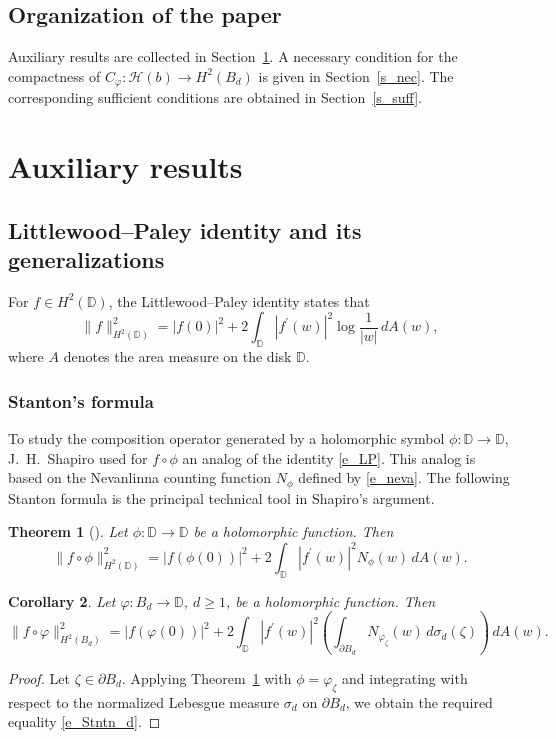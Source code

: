 \documentclass{amsart}
\numberwithin{equation}{section}
\newtheorem{theorem}{Theorem}[section]
\newtheorem{corollary}[theorem]{Corollary}
\theoremstyle{definition}
\newcommand{\bd}{{B_d}}
\newcommand{\neva}{N}
\newcommand{\aream}{A}
\newcommand{\meal}{\sigma_d}
\newcommand{\dbr}{\mathcal{H}}
\newcommand{\za}{\zeta}
\newcommand{\ph}{\varphi}
\newcommand{\cph}{C_\varphi}
\newcommand{\Dbb}{\mathbb D}
\newcommand{\spd}{\partial B_d}
\begin{document}
\subsection*{Organization of the paper}
Auxiliary results are collected in Section~\ref{s_aux}. 
A necessary condition for the compactness of
$\cph: \dbr(b) \to H^2(\bd)$ is given in Section~\ref{s_nec}.
The corresponding sufficient conditions are obtained in Section~\ref{s_suff}.



\section{Auxiliary results}\label{s_aux}
\subsection{Littlewood--Paley identity and its generalizations}\label{ss_HL}

For $f\in H^2(\Dbb)$, the Little\-wood--Paley identity states that
\begin{equation}\label{e_LP}
\|f\|^2_{H^2(\Dbb)} = |f(0)|^2 + 2\int_{\Dbb} |f^\prime(w)|^2 \log\frac{1}{|w|}\, d\aream(w),
\end{equation}
where $\aream$ denotes the area measure on the disk $\Dbb$.


\subsubsection{Stanton's formula}
To study the composition operator generated by a holomorphic symbol $\phi:\Dbb \to \Dbb$,
J.~H.~Shapiro \cite{ShJoel87} used for $f\circ\phi$ an analog of the identity \eqref{e_LP}.
This analog is based on the Nevanlinna counting function $\neva_\phi$ defined by \eqref{e_neva}.
The following Stanton formula is the principal technical tool in Shapiro's argument. 

\begin{theorem}[\cite{ShJoel87}]\label{t_Stn_disk}
Let $\phi: \Dbb\to\Dbb$ be a holomorphic function.
Then
\begin{equation}\label{e_Stntn}
\|f\circ \phi\|^2_{H^2(\Dbb)} = |f(\phi(0))|^2 + 2\int_{\Dbb} |f^\prime(w)|^2
\neva_{\phi}(w) \, d\aream(w).
\end{equation}
\end{theorem}


\begin{corollary}\label{c_Stanton}
Let $\ph: \bd\to\Dbb$, $d\ge 1$, be  a holomorphic function.
Then
\begin{equation}\label{e_Stntn_d}
\|f\circ \ph\|^2_{H^2(\bd)} = |f(\ph(0))|^2 + 2\int_{\Dbb} |f^\prime(w)|^2
\left(\int_{\spd} \neva_{\ph_\za}(w)\,  d\meal(\za) \right)\, d\aream(w).
\end{equation}
\end{corollary}
\begin{proof}
Let $\za\in \spd$.
Applying Theorem~\ref{t_Stn_disk} with $\phi = \ph_\za$ and integrating with respect to  the normalized Lebesgue measure
$\meal$ on $\spd$, we obtain the required equality \eqref{e_Stntn_d}.
\end{proof}
\end{document}
